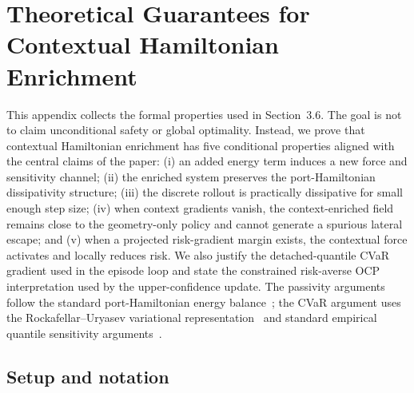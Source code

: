 
%   
%
%

\section{Theoretical Guarantees for Contextual Hamiltonian Enrichment}
\label{app:theory}

This appendix collects the formal properties used in Section~3.6.
The goal is not to claim unconditional safety or global optimality. Instead, we prove
that contextual Hamiltonian enrichment has five conditional properties aligned with
the central claims of the paper: (i) an added energy term induces a new force and
sensitivity channel; (ii) the enriched system preserves the port-Hamiltonian
dissipativity structure; (iii) the discrete rollout is practically dissipative for small
enough step size; (iv) when context gradients vanish, the context-enriched field remains close to the
geometry-only policy and cannot generate a spurious lateral escape; and (v) when a
projected risk-gradient margin exists, the contextual force activates and locally
reduces risk. We also justify the detached-quantile CVaR gradient used in the
episode loop and state the constrained risk-averse OCP interpretation used by the
upper-confidence update. The passivity arguments follow the standard port-Hamiltonian energy
balance~\citep{vanderschaft2014port,desai2021porthamiltonian}; the CVaR argument
uses the Rockafellar--Uryasev variational representation~\citep{rockafellar2000optimization}
and standard empirical quantile sensitivity arguments~\citep{hong2014monte}.

\subsection{Setup and notation}
\label{app:setup}

